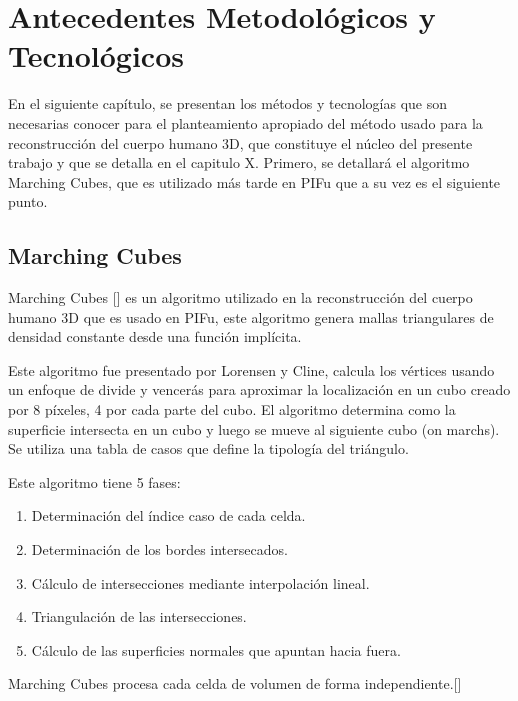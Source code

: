 
\chapter{Antecedentes Metodológicos y Tecnológicos}
\label{Antecedentes Metodológicos y Tecnológicos}
En el siguiente capítulo, se presentan los métodos y tecnologías que son necesarias
conocer para el planteamiento apropiado del método usado para la reconstrucción del cuerpo humano 3D, que constituye el núcleo del presente trabajo y que se detalla en el capitulo X.
Primero, se detallará el algoritmo Marching Cubes, que es utilizado más tarde en PIFu que a su vez es el siguiente punto. 

\section{Marching Cubes}
Marching Cubes [\cite{marchingcube}] es un algoritmo utilizado en la reconstrucción del cuerpo humano 3D que es usado en PIFu, este algoritmo genera mallas triangulares de densidad constante desde una función implícita. 

Este algoritmo fue presentado por Lorensen y Cline, calcula los vértices usando un enfoque de divide y vencerás para aproximar la localización en un cubo creado por 8 píxeles, 4 por cada parte del cubo. El algoritmo determina como la superficie intersecta en un cubo y luego se mueve al siguiente cubo (on marchs). Se utiliza una tabla de casos que define la tipología del triángulo.

Este algoritmo tiene 5 fases:
\begin{enumerate}
	\item Determinación del índice caso de cada celda.
	\item Determinación de los bordes intersecados.
	\item Cálculo de intersecciones mediante interpolación lineal.
	\item Triangulación de las intersecciones.
	\item Cálculo de las superficies normales que apuntan hacia fuera.
\end{enumerate}
Marching Cubes procesa cada celda de volumen de forma independiente.[\cite{marchingcubes2}]


